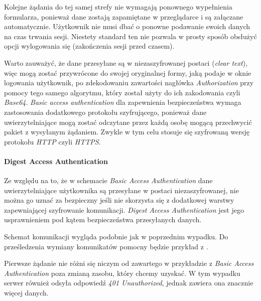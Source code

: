 \documentclass[11pt]{aghdpl}
\begin{document}
Kolejne żądania do tej samej strefy nie wymagają ponownego wypełnienia formularza, ponieważ dane zostają zapamiętane w przeglądarce i są załączane automatycznie. Użytkownik nie musi dbać o ponowne podawanie swoich danych na czas trwania sesji. Niestety standard ten nie pozwala w prosty sposób obsłużyć opcji wylogowania się (zakończenia sesji przed czasem).

Warto zauważyć, że dane przesyłane są w niezaszyfrowanej postaci (\emph{clear text}), więc mogą zostać przywrócone do swojej oryginalnej formy, jaką podaje w oknie logowania użytkownik, po zdekodowaniu zawartości nagłówka \emph{Authorization} przy pomocy tego samego algorytmu, który został użyty do ich zakodowania czyli \emph{Base64}. \emph{Basic access authentication} dla zapewnienia bezpieczeństwa wymaga zastosowania dodatkowego protokołu szyfrującego, ponieważ dane uwierzytelniające mogą zostać odczytane przez każdą osobę mogącą przechwycić pakiet z wysyłanym żądaniem. Zwykle w tym celu stosuje się szyfrowaną wersję protokołu \emph{HTTP} czyli \emph{HTTPS}.

\paragraph{Digest Access Authentication}

Ze względu na to, że w schemacie \emph{Basic Access Authentication} dane uwierzytelniające użytkownika są przesyłane w postaci niezaszyfrowanej, nie można go uznać za bezpieczny jeśli nie skorzysta się z dodatkowej warstwy zapewniającej szyfrowanie komunikacji. \emph{Digest Access Authentication} jest jego usprawnieniem pod kątem bezpieczeństwa przesyłanych danych.

Schemat komunikacji wygląda podobnie jak w poprzednim wypadku. Do prześledzenia wymiany komunikatów pomocny będzie przykład z \cite{BDA99}.

Pierwsze żądanie nie różni się niczym od zawartego w przykładzie z \emph{Basic Access Authentication} poza zmianą zasobu, który chcemy uzyskać. W tym wypadku serwer również odsyła odpowiedź \emph{401 Unauthorized}, jednak zawiera ona znacznie więcej danych.
\end{document}

